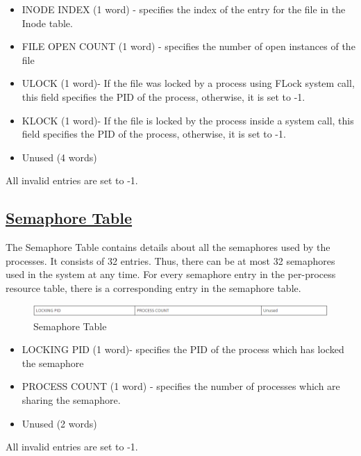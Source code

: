 \begin {itemize}
\item INODE INDEX (1 word) - specifies the index of the entry for the file in the Inode table.
\item FILE OPEN COUNT (1 word) - specifies the number of open instances of the file
\item ULOCK (1 word)- If the file was locked by a process using FLock system call, this field specifies the PID of the process, otherwise, it is set to -1.
\item KLOCK (1 word)- If the file is locked by the process inside a system call, this field specifies the PID of the process, otherwise, it is set to -1.
\item Unused (4 words)
\end {itemize}
All invalid entries are set to -1.

\subsection{\href{http://exposnitc.github.io/os_design-files/mem_ds.html#sem_table}{Semaphore Table}}

The Semaphore Table contains details about all the semaphores used by the processes. It consists of 32 entries. Thus, there can be at most 32 semaphores used in the system at any time. For every semaphore entry in the per-process resource table, there is a corresponding entry in the semaphore table.
\\
\begin{figure}[ht]
\centering
\includegraphics  [scale=0.55]{figures/st.png}
\caption{\footnotesize Semaphore Table}
\end{figure}

\begin {itemize}

\item LOCKING PID (1 word)- specifies the PID of the process which has locked the semaphore
\item PROCESS COUNT (1 word) - specifies the number of processes which are sharing the semaphore.
\item Unused (2 words)
\end {itemize}

All invalid entries are set to -1.

